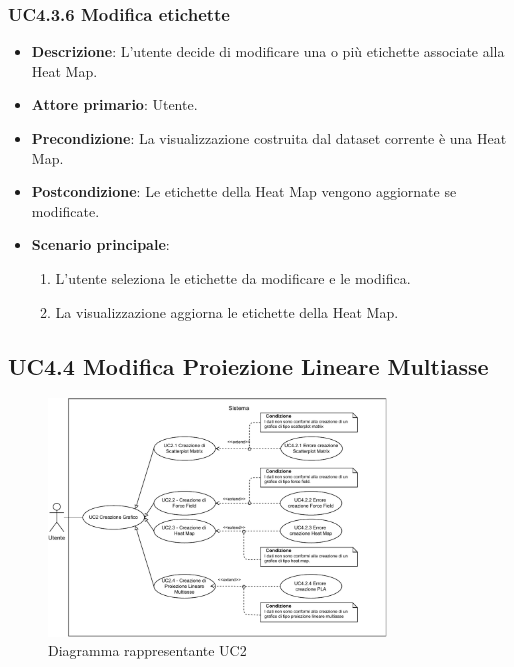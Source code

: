 \subsubsection{UC4.3.6 Modifica etichette}
\label{subsec:uc4.2.1}
\begin{itemize}
    \item \textbf{Descrizione}: L’utente decide di modificare una o più etichette associate alla Heat Map.

    \item \textbf{Attore primario}: Utente.
    
    \item \textbf{Precondizione}:   La visualizzazione costruita dal dataset corrente è una Heat Map.
    \item \textbf{Postcondizione}:  Le etichette della Heat Map vengono aggiornate se modificate.
	\item \textbf{Scenario principale}:
        \begin{enumerate}
            \item   L'utente seleziona le etichette da modificare e le modifica.
            \item   La visualizzazione aggiorna le etichette della Heat Map. %
        \end{enumerate}
\end{itemize}

\subsection{UC4.4 Modifica Proiezione Lineare Multiasse}
\label{subsec:uc4.4}
\begin{figure}[h]
    \centering
    \includegraphics[width=0.8\textwidth]{componenti/casi-duso/diagrammi/UC2.pdf}
    \caption{Diagramma rappresentante UC2}
    \label{fig:UC4.4}
\end{figure}


